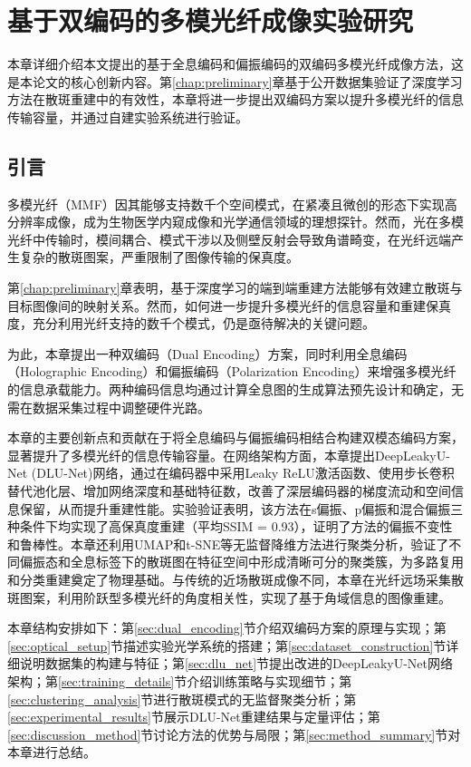 
\chapter{基于双编码的多模光纤成像实验研究}\label{chap:method}

{
本章详细介绍本文提出的基于全息编码和偏振编码的双编码多模光纤成像方法，这是本论文的核心创新内容。第\ref{chap:preliminary}章基于公开数据集验证了深度学习方法在散斑重建中的有效性，本章将进一步提出双编码方案以提升多模光纤的信息传输容量，并通过自建实验系统进行验证。

\section{引言}\label{sec:method_intro}

多模光纤（MMF）因其能够支持数千个空间模式，在紧凑且微创的形态下实现高分辨率成像，成为生物医学内窥成像和光学通信领域的理想探针。然而，光在多模光纤中传输时，模间耦合、模式干涉以及侧壁反射会导致角谱畸变，在光纤远端产生复杂的散斑图案，严重限制了图像传输的保真度。

第\ref{chap:preliminary}章表明，基于深度学习的端到端重建方法能够有效建立散斑与目标图像间的映射关系。然而，如何进一步提升多模光纤的信息容量和重建保真度，充分利用光纤支持的数千个模式，仍是亟待解决的关键问题。

为此，本章提出一种双编码（Dual Encoding）方案，同时利用全息编码（Holographic Encoding）和偏振编码（Polarization Encoding）来增强多模光纤的信息承载能力。两种编码信息均通过计算全息图的生成算法预先设计和确定，无需在数据采集过程中调整硬件光路。

本章的主要创新点和贡献在于将全息编码与偏振编码相结合构建双模态编码方案，显著提升了多模光纤的信息传输容量。在网络架构方面，本章提出DeepLeakyU-Net (DLU-Net)网络，通过在编码器中采用Leaky ReLU激活函数、使用步长卷积替代池化层、增加网络深度和基础特征数，改善了深层编码器的梯度流动和空间信息保留，从而提升重建性能。实验验证表明，该方法在s偏振、p偏振和混合偏振三种条件下均实现了高保真度重建（平均SSIM = 0.93），证明了方法的偏振不变性和鲁棒性。本章还利用UMAP和t-SNE等无监督降维方法进行聚类分析，验证了不同偏振态和全息标签下的散斑图在特征空间中形成清晰可分的聚类簇，为多路复用和分类重建奠定了物理基础。与传统的近场散斑成像不同，本章在光纤远场采集散斑图案，利用阶跃型多模光纤的角度相关性，实现了基于角域信息的图像重建。

本章结构安排如下：第\ref{sec:dual_encoding}节介绍双编码方案的原理与实现；第\ref{sec:optical_setup}节描述实验光学系统的搭建；第\ref{sec:dataset_construction}节详细说明数据集的构建与特征；第\ref{sec:dlu_net}节提出改进的DeepLeakyU-Net网络架构；第\ref{sec:training_details}节介绍训练策略与实现细节；第\ref{sec:clustering_analysis}节进行散斑模式的无监督聚类分析；第\ref{sec:experimental_results}节展示DLU-Net重建结果与定量评估；第\ref{sec:discussion_method}节讨论方法的优势与局限；第\ref{sec:method_summary}节对本章进行总结。


}
